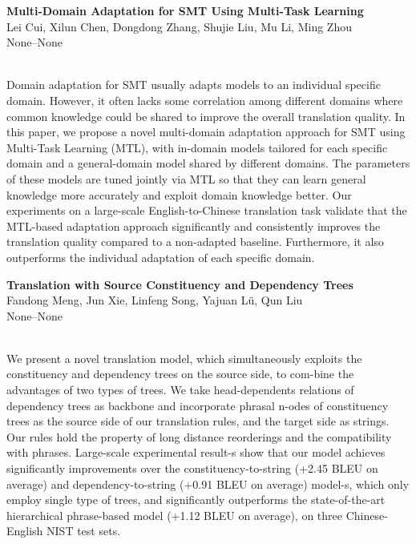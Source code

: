 \documentclass[twoside,makeidx]{book}
\renewcommand{\normalsize}{\fontsize{8}{9}\selectfont}
\renewcommand{\small}{\fontsize{7}{8}\selectfont}
\begin{document}
\par\vspace{2em}\noindent%
\begin{minipage}{\linewidth}%
\begin{center}
\textbf{\normalsize Multi-Domain Adaptation for SMT Using Multi-Task Learning}\\
\normalsize  Lei Cui,  Xilun Chen,  Dongdong Zhang,  Shujie Liu,  Mu Li,  Ming Zhou\\
{\small None--None}\\
\end{center}
\end{minipage}\\[0.5em]
\nopagebreak%
\noindent%
{\small Domain adaptation for SMT usually adapts models to an individual specific domain. However, it often lacks some correlation among different domains where common knowledge could be shared to improve the overall translation quality. In this paper, we propose a novel multi-domain adaptation approach for SMT using Multi-Task Learning (MTL), with in-domain models tailored for each specific domain and a general-domain model shared by different domains. The parameters of these models are tuned jointly via MTL so that they can learn general knowledge more accurately and exploit domain knowledge better. Our experiments on a large-scale English-to-Chinese translation task validate that the MTL-based adaptation approach significantly and consistently improves the translation quality compared to a non-adapted baseline. Furthermore, it also outperforms the individual adaptation of each specific domain.}
\par\vspace{2em}\noindent%
\begin{minipage}{\linewidth}%
\begin{center}
\textbf{\normalsize Translation with Source Constituency and Dependency Trees}\\
\normalsize  Fandong Meng,  Jun Xie,  Linfeng Song,  Yajuan L\"{u},  Qun Liu\\
{\small None--None}\\
\end{center}
\end{minipage}\\[0.5em]
\nopagebreak%
\noindent%
{\small We present a novel translation model, which simultaneously exploits the constituency and dependency trees on the source side, to com-bine the advantages of two types of trees. We take head-dependents relations of dependency trees as backbone and incorporate phrasal n-odes of constituency trees as the source side of our translation rules, and the target side as strings. Our rules hold the property of long distance reorderings and the compatibility with phrases. Large-scale experimental result-s show that our model achieves significantly improvements over the constituency-to-string (+2.45 BLEU on average) and dependency-to-string (+0.91 BLEU on average) model-s, which only employ single type of trees, and significantly outperforms the state-of-the-art hierarchical phrase-based model (+1.12 BLEU on average), on three Chinese-English NIST test sets.}
\end{document}
